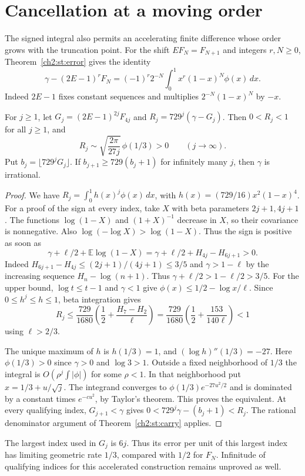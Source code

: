 \documentclass[11pt,a4paper,oneside,openany]{report}
\theoremstyle{remark}\newtheorem{remark}[theorem]{Remark}
\numberwithin{equation}{section}
\begin{document}
\section{Cancellation at a moving order}
The signed integral also permits an accelerating finite difference whose order grows with the truncation point. For the shift $E F_N=F_{N+1}$ and integers $r,N\ge0$, Theorem~\ref{ch2:st:error} gives the identity
\[
 \gamma-(2E-1)^r F_N=(-1)^r2^{-N}\int_0^1 x^r(1-x)^N\phi(x)\,dx .
\]
Indeed $2E-1$ fixes constant sequences and multiplies $2^{-N}(1-x)^N$ by $-x$.

\begin{proposition}\label{ch2:st:729}
For $j\ge1$, let $G_j=(2E-1)^{2j}F_{4j}$ and $R_j=729^j(\gamma-G_j)$. Then $0<R_j<1$ for all $j\ge1$, and
\[
 R_j\sim\sqrt{\frac{2\pi}{27j}}\,\phi(1/3)>0\qquad(j\longrightarrow\infty).
\]
Put $b_j=\lfloor729^jG_j\rfloor$. If $b_{j+1}\ge729(b_j+1)$ for infinitely many $j$, then $\gamma$ is irrational.
\end{proposition}
\begin{proof}
We have $R_j=\int_0^1 h(x)^j\phi(x)\,dx$, with
$h(x)=(729/16)x^2(1-x)^4$. For a proof of the sign at every index, take $X$ with beta parameters $2j+1,4j+1$. The functions $\log(1-X)$ and $(1+X)^{-1}$ decrease in $X$, so their covariance is nonnegative. Also $\log(-\log X)>\log(1-X)$. Thus the sign is positive as soon as
\[
 \gamma+\ell/2+\mathbb E\log(1-X)
 =\gamma+\ell/2+H_{4j}-H_{6j+1}>0 .
\]
Indeed $H_{6j+1}-H_{4j}\le(2j+1)/(4j+1)\le3/5$ and $\gamma>1-\ell$ by the increasing sequence $H_n-\log(n+1)$. Thus $\gamma+\ell/2>1-\ell/2>3/5$.
For the upper bound, $\log t\le t-1$ and $\gamma<1$ give $\phi(x)\le1/2-\log x/\ell$. Since $0\le h^j\le h\le1$, beta integration gives
\[
 R_j\le\frac{729}{1680}\left(\frac12+\frac{H_7-H_2}{\ell}\right)
 =\frac{729}{1680}\left(\frac12+\frac{153}{140\ell}\right)<1
\]
using $\ell>2/3$.

The unique maximum of $h$ is $h(1/3)=1$, and $(\log h)''(1/3)=-27$. Here $\phi(1/3)>0$ since $\gamma>0$ and $\log3>1$. Outside a fixed neighborhood of $1/3$ the integral is $O(\rho^j\int|\phi|)$ for some $\rho<1$. In that neighborhood put $x=1/3+u/\sqrt j$. The integrand converges to $\phi(1/3)e^{-27u^2/2}$ and is dominated by a constant times $e^{-c u^2}$, by Taylor's theorem. This proves the equivalent. At every qualifying index, $G_{j+1}<\gamma$ gives $0<729^j\gamma-(b_j+1)<R_j$. The rational denominator argument of Theorem~\ref{ch2:st:carry} applies.
\end{proof}
The largest index used in $G_j$ is $6j$. Thus its error per unit of this largest index has limiting geometric rate $1/3$, compared with $1/2$ for $F_N$. Infinitude of qualifying indices for this accelerated construction remains unproved as well.
\end{document}

